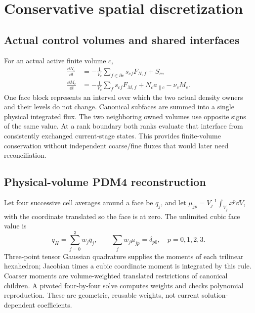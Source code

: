 \section{Conservative spatial discretization}
\subsection{Actual control volumes and shared interfaces}
For an actual active finite volume $c$,
\begin{align}
 \frac{\dd N_c}{\dd t}&=-\frac1{V_c}\sum_{f\in\partial c}s_{cf}F_{N,f}+S_c,\\
 \frac{\dd M_c}{\dd t}&=-\frac1{V_c}\sum_f s_{cf}F_{M,f}
 +N_c a_{\parallel c}-\nu_cM_c.
\end{align}
One face block represents an interval over which the two actual density
owners and their levels do not change. Canonical subfaces are summed into a
single physical integrated flux. The two neighboring owned volumes use
opposite signs of the same value. At a rank boundary both ranks evaluate
that interface from consistently exchanged current-stage states. This
provides finite-volume conservation without independent coarse/fine fluxes
that would later need reconciliation.

\subsection{Physical-volume PDM4 reconstruction}
Let four successive cell averages around a face be $\bar q_j$, and let
$\mu_{jp}=V_j^{-1}\int_{V_j}x^p\dd V$, with the coordinate translated so the
face is at zero. The unlimited cubic face value is
\begin{equation}
 q_H=\sum_{j=0}^3 w_j\bar q_j,\qquad
 \sum_jw_j\mu_{jp}=\delta_{p0},\quad p=0,1,2,3.
 \label{eq:moments}
\end{equation}
Three-point tensor Gaussian quadrature supplies the moments of each
trilinear hexahedron; Jacobian times a cubic coordinate moment is integrated
by this rule. Coarser moments are volume-weighted translated restrictions of
canonical children. A pivoted four-by-four solve computes weights and checks
polynomial reproduction. These are geometric, reusable weights, not current
solution-dependent coefficients.

